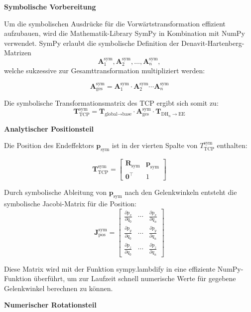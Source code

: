 \vspace{1em}
\noindent
\textbf{Symbolische Vorbereitung}

Um die symbolischen Ausdrücke für die Vorwärtstransformation effizient aufzubauen, wird die Mathematik-Library SymPy in Kombination mit NumPy verwendet.
SymPy erlaubt die symbolische Definition der Denavit-Hartenberg-Matrizen
\[
\mathbf{A}_1^{\text{sym}}, \mathbf{A}_2^{\text{sym}}, \dots, \mathbf{A}_n^{\text{sym}},
\]
welche sukzessive zur Gesamttransformation multipliziert werden:

\[
\mathbf{A}_{\text{ges}}^{\text{sym}} = \mathbf{A}_1^{\text{sym}} \cdot \mathbf{A}_2^{\text{sym}} \cdots \mathbf{A}_n^{\text{sym}}
\]

Die symbolische Transformationsmatrix des TCP ergibt sich somit zu:
\[
\mathbf{T}_{\text{TCP}}^{\text{sym}} = \mathbf{T}_{\text{global} \rightarrow \text{base}} \cdot \mathbf{A}_{\text{ges}}^{\text{sym}} \cdot \mathbf{T}_{\text{DH}_n \rightarrow \text{EE}}
\]

\vspace{1em}
\noindent
\textbf{Analytischer Positionsteil}

Die Position des Endeffektors $\mathbf{p}_{\text{sym}}$ ist in der vierten Spalte von $T_{\text{TCP}}^{\text{sym}}$ enthalten:

\[
\mathbf{T}_{\text{TCP}}^{\text{sym}} =
\begin{bmatrix}
\mathbf{R}_{\text{sym}} & \mathbf{p}_{\text{sym}} \\
\mathbf{0}^\top & 1
\end{bmatrix}
\]

Durch symbolische Ableitung von $\mathbf{p}_{\text{sym}}$ nach den Gelenkwinkeln entsteht die symbolische Jacobi-Matrix für die Position:
\[
\mathbf{J}_{\text{pos}}^{\text{sym}} =
\begin{bmatrix}
\frac{\partial p_x}{\partial q_0} & \cdots & \frac{\partial p_x}{\partial q_n} \\
\frac{\partial p_y}{\partial q_0} & \cdots & \frac{\partial p_y}{\partial q_n} \\
\frac{\partial p_z}{\partial q_0} & \cdots & \frac{\partial p_z}{\partial q_n}
\end{bmatrix}
\]

Diese Matrix wird mit der Funktion sympy.lambdify in eine effiziente NumPy-Funktion überführt, um zur Laufzeit schnell numerische Werte für gegebene Gelenkwinkel berechnen zu können.

\vspace{1em}
\noindent
\textbf{Numerischer Rotationsteil}

